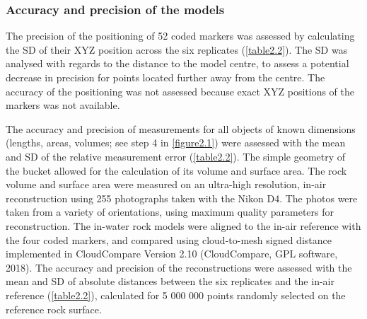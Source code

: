 \subsubsection{Accuracy and precision of the models}\label{chapitre2_2.3.3}
The precision of the positioning of 52 coded markers was assessed by calculating the SD of their XYZ position across the six replicates (\autoref{table2.2}). The SD was analysed with regards to the distance to the model centre, to assess a potential decrease in precision for points located further away from the centre. The accuracy of the positioning was not assessed because exact XYZ positions of the markers was not available.

The accuracy and precision of measurements for all objects of known dimensions (lengths, areas, volumes; see step 4 in \autoref{figure2.1}) were assessed with the mean and SD of the relative measurement error (\autoref{table2.2}). The simple geometry of the bucket allowed for the calculation of its volume and surface area. The rock volume and surface area were measured on an ultra-high resolution, in-air reconstruction \citep{bryson_characterization_2017} using 255 photographs taken with the Nikon D4. The photos were taken from a variety of orientations, using maximum quality parameters for reconstruction. The in-water rock models were aligned to the in-air reference with the four coded markers, and compared using cloud-to-mesh signed distance implemented in CloudCompare Version 2.10 (CloudCompare, GPL software, 2018). The accuracy and precision of the reconstructions were assessed with the mean and SD of absolute distances between the six replicates and the in-air reference (\autoref{table2.2}), calculated for 5 000 000 points randomly selected on the reference rock surface.

